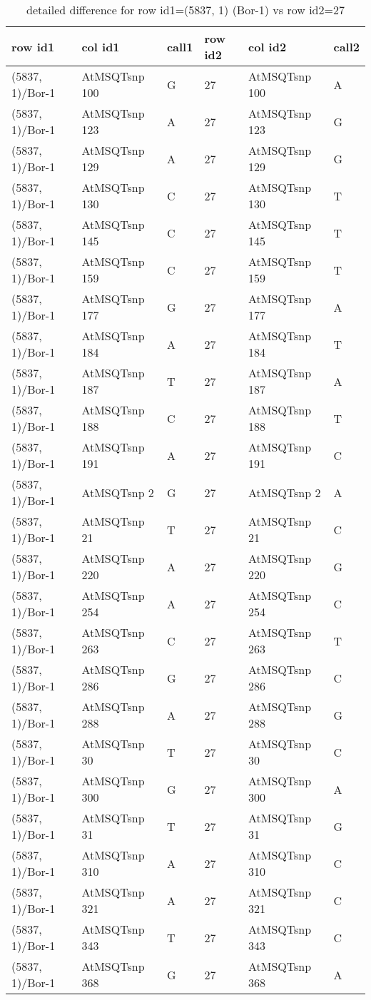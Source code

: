 \begin{center}
\begin{longtable}{|l|l|l|l|l|l|}
\caption{detailed difference for row id1=(5837, 1) (Bor-1) vs row id2=27} \label{table_dm3}\\
\hline
row id1&col id1&call1&row id2&col id2&call2\\
\hline
(5837, 1)/Bor-1&AtMSQTsnp 100&G&27&AtMSQTsnp 100&A\\
(5837, 1)/Bor-1&AtMSQTsnp 123&A&27&AtMSQTsnp 123&G\\
(5837, 1)/Bor-1&AtMSQTsnp 129&A&27&AtMSQTsnp 129&G\\
(5837, 1)/Bor-1&AtMSQTsnp 130&C&27&AtMSQTsnp 130&T\\
(5837, 1)/Bor-1&AtMSQTsnp 145&C&27&AtMSQTsnp 145&T\\
(5837, 1)/Bor-1&AtMSQTsnp 159&C&27&AtMSQTsnp 159&T\\
(5837, 1)/Bor-1&AtMSQTsnp 177&G&27&AtMSQTsnp 177&A\\
(5837, 1)/Bor-1&AtMSQTsnp 184&A&27&AtMSQTsnp 184&T\\
(5837, 1)/Bor-1&AtMSQTsnp 187&T&27&AtMSQTsnp 187&A\\
(5837, 1)/Bor-1&AtMSQTsnp 188&C&27&AtMSQTsnp 188&T\\
(5837, 1)/Bor-1&AtMSQTsnp 191&A&27&AtMSQTsnp 191&C\\
(5837, 1)/Bor-1&AtMSQTsnp 2&G&27&AtMSQTsnp 2&A\\
(5837, 1)/Bor-1&AtMSQTsnp 21&T&27&AtMSQTsnp 21&C\\
(5837, 1)/Bor-1&AtMSQTsnp 220&A&27&AtMSQTsnp 220&G\\
(5837, 1)/Bor-1&AtMSQTsnp 254&A&27&AtMSQTsnp 254&C\\
(5837, 1)/Bor-1&AtMSQTsnp 263&C&27&AtMSQTsnp 263&T\\
(5837, 1)/Bor-1&AtMSQTsnp 286&G&27&AtMSQTsnp 286&C\\
(5837, 1)/Bor-1&AtMSQTsnp 288&A&27&AtMSQTsnp 288&G\\
(5837, 1)/Bor-1&AtMSQTsnp 30&T&27&AtMSQTsnp 30&C\\
(5837, 1)/Bor-1&AtMSQTsnp 300&G&27&AtMSQTsnp 300&A\\
(5837, 1)/Bor-1&AtMSQTsnp 31&T&27&AtMSQTsnp 31&G\\
(5837, 1)/Bor-1&AtMSQTsnp 310&A&27&AtMSQTsnp 310&C\\
(5837, 1)/Bor-1&AtMSQTsnp 321&A&27&AtMSQTsnp 321&C\\
(5837, 1)/Bor-1&AtMSQTsnp 343&T&27&AtMSQTsnp 343&C\\
(5837, 1)/Bor-1&AtMSQTsnp 368&G&27&AtMSQTsnp 368&A\\

\end{longtable}
\end{center}
